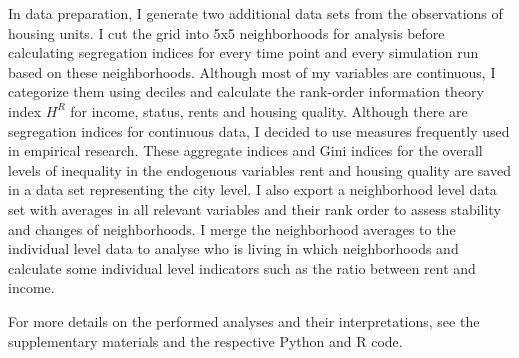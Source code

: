 In data preparation, I generate two additional data sets from the observations of housing units. I cut the grid into 5x5 neighborhoods for analysis before calculating segregation indices for every time point and every simulation run based on these neighborhoods. Although most of my variables are continuous, I categorize them using deciles and calculate the rank-order information theory index $H^R$ \citep{reardonNewApproachMeasuring2006} for income, status, rents and housing quality. Although there are segregation indices for continuous data, I decided to use measures frequently used in empirical research. These aggregate indices and Gini indices for the overall levels of inequality in the endogenous variables rent and housing quality are saved in a data set representing the city level. I also export a neighborhood level data set with averages in all relevant variables and their rank order to assess stability and changes of neighborhoods. I merge the neighborhood averages to the individual level data to analyse who is living in which neighborhoods and calculate some individual level indicators such as the ratio between rent and income.

For more details on the performed analyses and their interpretations, see the supplementary materials and the respective Python and R code.